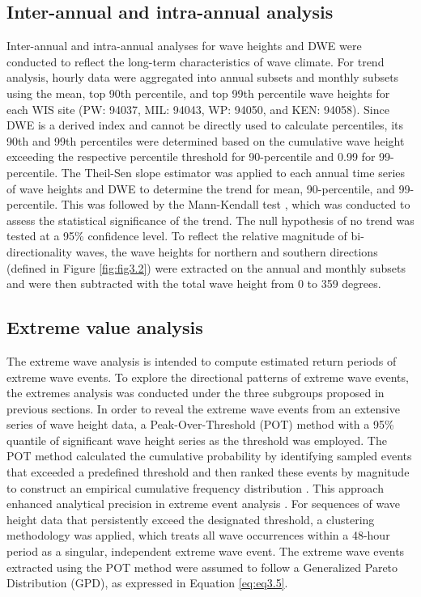\subsection{Inter-annual and intra-annual analysis}
\label{c3_Inter-annual and intra-annual analysis}

Inter-annual and intra-annual analyses for wave heights and DWE were conducted
to reflect the long-term characteristics of wave climate. For trend analysis,
hourly data were aggregated into annual subsets and monthly subsets using the
mean, top 90th percentile, and top 99th percentile wave heights for each WIS
site (PW: 94037, MIL: 94043, WP: 94050, and KEN: 94058). Since DWE is a derived
index and cannot be directly used to calculate percentiles, its 90th and 99th
percentiles were determined based on the cumulative wave height exceeding the
respective percentile threshold for 90-percentile and 0.99 for 99-percentile.
The Theil-Sen slope estimator was applied to each annual time series of wave
heights and DWE to determine the trend for mean, 90-percentile, and
99-percentile. This was followed by the Mann-Kendall test
\citep{kendall_new_1938,mann_nonparametric_1945}, which was conducted to assess
the statistical significance of the trend. The null hypothesis of no trend was
tested at a 95\% confidence level. To reflect the relative magnitude of
bi-directionality waves, the wave heights for northern and southern directions
(defined in Figure \ref{fig:fig3.2}) were extracted on the annual and monthly
subsets and were then subtracted with the total wave height from 0 to 359
degrees.

\subsection{Extreme value analysis}
\label{c3_Extreme value analysis}

The extreme wave analysis is intended to compute estimated return periods of
extreme wave events. To explore the directional patterns of extreme wave events,
the extremes analysis was conducted under the three subgroups proposed in
previous sections. In order to reveal the extreme wave events from an extensive
series of wave height data, a Peak-Over-Threshold (POT) method with a 95\%
quantile of significant wave height series as the threshold was employed. The
POT method calculated the cumulative probability by identifying sampled events
that exceeded a predefined threshold and then ranked these events by magnitude
to construct an empirical cumulative frequency distribution
\citep{bechle_meteotsunami_2015}. This approach enhanced analytical precision in
extreme event analysis \citep{coles_introduction_2001}. For sequences of wave
height data that persistently exceed the designated threshold, a clustering
methodology was applied, which treats all wave occurrences within a 48-hour
period as a singular, independent extreme wave event. The extreme wave events
extracted using the POT method were assumed to follow a Generalized Pareto
Distribution (GPD), as expressed in Equation \ref{eq:eq3.5}.

